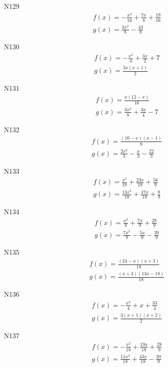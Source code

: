\documentclass[11pt]{report}
\begin{document}
N129
\begin{align*}
 f(x) = - \frac{x^{2}}{16} + \frac{7 x}{8} + \frac{19}{16}\\
 g(x) = \frac{3 x^{2}}{8} - \frac{43}{8}
\end{align*}

N130
\begin{align*}
 f(x) = - \frac{x^{2}}{4} + \frac{3 x}{2} + 7\\
 g(x) = \frac{3 x \left(x + 1\right)}{2}
\end{align*}

N131
\begin{align*}
 f(x) = \frac{x \left(12 - x\right)}{16}\\
 g(x) = \frac{3 x^{2}}{8} + \frac{3 x}{4} - 7
\end{align*}

N132
\begin{align*}
 f(x) = \frac{\left(10 - x\right) \left(x - 1\right)}{9}\\
 g(x) = \frac{2 x^{2}}{3} - \frac{x}{3} - \frac{22}{3}
\end{align*}

N133
\begin{align*}
 f(x) = \frac{x^{2}}{18} + \frac{23 x}{18} + \frac{56}{9}\\
 g(x) = \frac{13 x^{2}}{18} + \frac{47 x}{18} + \frac{8}{9}
\end{align*}

N134
\begin{align*}
 f(x) = \frac{x^{2}}{9} + \frac{7 x}{9} + \frac{28}{9}\\
 g(x) = \frac{7 x^{2}}{9} - \frac{5 x}{9} - \frac{20}{9}
\end{align*}

N135
\begin{align*}
 f(x) = \frac{\left(24 - x\right) \left(x + 3\right)}{18}\\
 g(x) = \frac{\left(x + 3\right) \left(13 x - 18\right)}{18}
\end{align*}

N136
\begin{align*}
 f(x) = - \frac{x^{2}}{4} + x + \frac{33}{4}\\
 g(x) = \frac{3 \left(x + 1\right) \left(x + 2\right)}{2}
\end{align*}

N137
\begin{align*}
 f(x) = - \frac{x^{2}}{18} + \frac{19 x}{18} + \frac{28}{9}\\
 g(x) = \frac{11 x^{2}}{18} + \frac{43 x}{18} - \frac{20}{9}
\end{align*}
\end{document}
